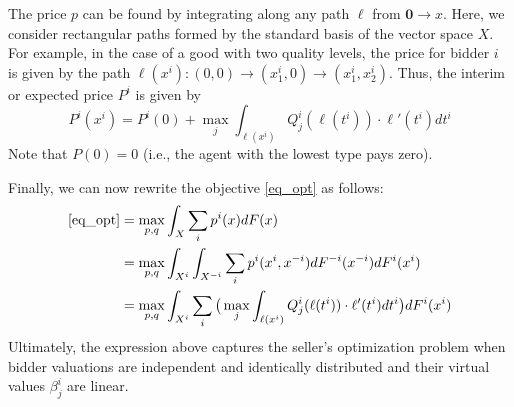 


The price $p$ can be found by integrating along any path $\ell$ from $\mathbf{0} \to x$. Here, we consider rectangular paths formed by the standard basis of the vector space $X$. For example, in the case of a good with two quality levels, the price for bidder $i$ is given by the path $\ell(x^i) : (0,0) \to (x_1^i,0) \to (x_1^i,x_2^i)$. Thus, the interim or expected price $P^i$ is given by
\begin{equation}
    P^i(x^i) = P^i(0) + \max_j \int_{\ell(x^i)} Q_j^i(\ell(t^i)) \cdot \ell'(t^i) dt^i 
\end{equation}
\noindent Note that $P(0)=0$ (i.e., the agent with the lowest type pays zero).

Finally, we can now rewrite the objective \ref{eq_opt} as follows:
\begin{align}
    \ref{eq_opt} &= \max_{p,q} \int_X \sum_i p^i(x) dF(x) \\
        &= \max_{p,q} \int_{X^i} \int_{X^{-i}} \sum_i p^i(x^i, x^{-i}) dF^{-i}(x^{-i}) dF^i(x^i) \\
        &= \max_{p,q} \int_{X^i} \sum_i \big( \max_j \int_{\ell(x^i)} Q_j^i(\ell(t^i)) \cdot \ell'(t^i) dt^i \big) dF^i(x^i)
\end{align}
\noindent Ultimately, the expression above captures the seller's optimization problem when bidder valuations are independent and identically distributed and their virtual values $\beta_j^i$ are linear.




